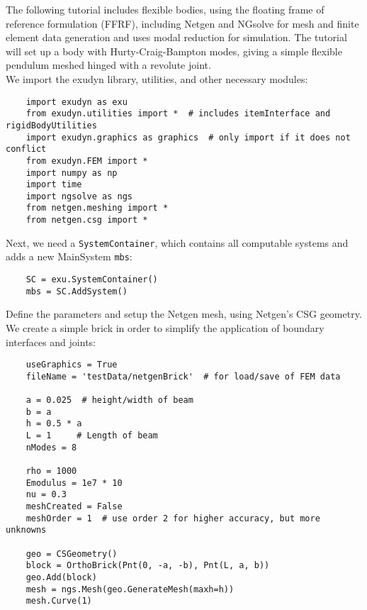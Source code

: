 The following tutorial includes flexible bodies, using the floating frame of reference formulation (FFRF), 
including Netgen and NGsolve for mesh and finite element data generation and uses modal reduction for simulation.
The tutorial will set up a body with Hurty-Craig-Bampton modes, giving a simple flexible pendulum meshed hinged with a revolute joint.
%
\vspace{6pt}\\
We import the exudyn library, utilities, and other necessary modules:
\pythonstyle\begin{lstlisting}
    import exudyn as exu
    from exudyn.utilities import *  # includes itemInterface and rigidBodyUtilities
    import exudyn.graphics as graphics  # only import if it does not conflict
    from exudyn.FEM import *
    import numpy as np
    import time
    import ngsolve as ngs
    from netgen.meshing import *
    from netgen.csg import *
\end{lstlisting}
%
Next, we need a \texttt{SystemContainer}, which contains all computable systems and adds a new MainSystem \texttt{mbs}:
\pythonstyle\begin{lstlisting}
    SC = exu.SystemContainer()
    mbs = SC.AddSystem()
\end{lstlisting}
%
Define the parameters and setup the Netgen mesh, using Netgen's CSG geometry. We create a simple brick in order to simplify the application of boundary interfaces and joints:
\pythonstyle\begin{lstlisting}
    useGraphics = True
    fileName = 'testData/netgenBrick'  # for load/save of FEM data
    
    a = 0.025  # height/width of beam
    b = a
    h = 0.5 * a 
    L = 1     # Length of beam
    nModes = 8

    rho = 1000
    Emodulus = 1e7 * 10
    nu = 0.3
    meshCreated = False
    meshOrder = 1  # use order 2 for higher accuracy, but more unknowns

    geo = CSGeometry()
    block = OrthoBrick(Pnt(0, -a, -b), Pnt(L, a, b))
    geo.Add(block)
    mesh = ngs.Mesh(geo.GenerateMesh(maxh=h))
    mesh.Curve(1)
\end{lstlisting}
